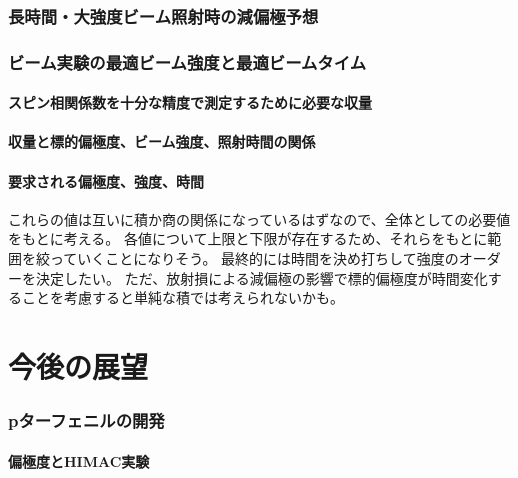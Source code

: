 \documentclass[a5j]{jsarticle}
\begin{document}
\section{長時間・大強度ビーム照射時の減偏極予想}
\section{ビーム実験の最適ビーム強度と最適ビームタイム}
\subsection{スピン相関係数を十分な精度で測定するために必要な収量}
\subsection{収量と標的偏極度、ビーム強度、照射時間の関係}
\subsection{要求される偏極度、強度、時間}
これらの値は互いに積か商の関係になっているはずなので、全体としての必要値をもとに考える。
各値について上限と下限が存在するため、それらをもとに範囲を絞っていくことになりそう。
最終的には時間を決め打ちして強度のオーダーを決定したい。
ただ、放射損による減偏極の影響で標的偏極度が時間変化することを考慮すると単純な積では考えられないかも。

\part{今後の展望}
\section{pターフェニルの開発}
\subsection{偏極度とHIMAC実験}
\end{document}
